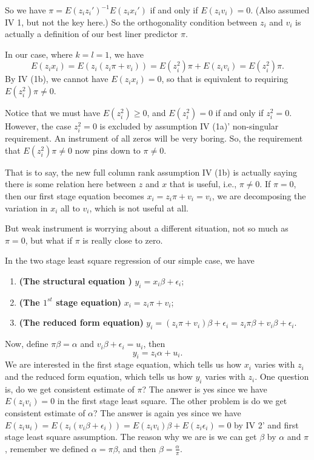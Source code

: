 \documentclass[11pt,a4paper]{amsart}
\theoremstyle{plain}
\theoremstyle{definition}
\begin{document}
		So we have $\pi = E(z_{i}z_{i}')^{-1}E(z_{i}x_{i}')$ if and only if $E(z_{i}v_{i}) = 0$. (Also assumed IV 1, but not the key here.) So the orthogonality condition between $z_{i}$ and $v_{i}$ is actually a definition of our best liner predictor $\pi$. \par 
		In our case, where $k = l = 1$, we have 
		\[	E(z_{i}x_{i}) = E(z_{i}(z_{i}\pi + v_{i})) = E(z_{i}^{2})\pi + E(z_{i}v_{i}) = E(z_{i}^{2})\pi . 	\]  
		By IV (1b), we cannot have $E(z_{i}x_{i}) = 0$, so that is equivalent to requiring $E(z_{i}^{2})\pi \ne 0$. \par 
		Notice that we must have $E(z_{i}^{2}) \geq 0$, and $E(z_{i}^{2}) = 0$ if and only if $z_{i}^{2} = 0$. However, the case $z_{i}^{2} = 0$ is excluded by assumption IV (1a)' non-singular requirement. An instrument of all zeros will be very boring. So, the requirement that $E(z_{i}^{2})\pi \ne 0$ now pins down to $\pi \ne 0$. \par
		That is to say, the new full column rank assumption IV (1b) is actually saying there is some relation here between $z$ and $x$ that is useful, i.e., $\pi \ne 0$. If $\pi = 0$, then our first stage equation becomes $x_{i} = z_{i}\pi + v_{i} = v_{i}$, we are decomposing the variation in $x_{i}$ all to $v_{i}$, which is not useful at all.\par 
		But weak instrument is worrying about a different situation, not so much as $\pi = 0$, but what if $\pi$ is really close to zero. \par 
		In the two stage least square regression of our simple case, we have 
		\begin{enumerate}
			\item \textbf{(The structural equation )} $y_{i} = x_{i}\beta + \epsilon_{i}$;
			\item \textbf{(The $1^{st}$ stage equation)} $x_{i} = z_{i}\pi + v_{i}$;
			\item \textbf{(The reduced form equation)} $y_{i} = (z_{i}\pi + v_{i})\beta + \epsilon_{i} =z_{i}\pi\beta + v_{i}\beta + \epsilon_{i}  $.
		\end{enumerate}
		Now, define $\pi\beta = \alpha$ and $v_{i}\beta + \epsilon_{i}=u_{i}$, then 
		\[	y_{i} = z_{i}\alpha + u_{i}.	\]
		We are interested in the first stage equation, which tells us how $x_{i}$ varies with $z_{i}$ and the reduced form equation, which tells us how $y_{i}$ varies with $z_{i}$. One question is, do we get consistent estimate of $\pi$? The answer is yes since we have $E(z_{i}v_{i}) = 0$ in the first stage least square. The other problem is do we get consistent estimate of $\alpha$? The answer is again yes since we have $E(z_{i}u_{i}) = E(z_{i}(v_{i}\beta + \epsilon_{i})) = E(z_{i}v_{i})\beta + E(z_{i}\epsilon_{i}) = 0$ by IV 2' and first stage least square assumption. The reason why we are is we can get $\beta$ by $\alpha$ and $\pi$, remember we defined $\alpha = \pi \beta $, and then $\beta = \frac{\alpha}{\pi}$. \par 
\end{document}
